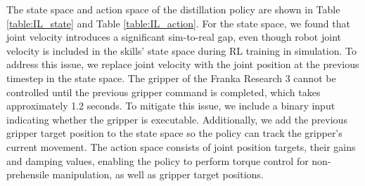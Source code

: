 

The state space and action space of the distillation policy are shown in Table \ref{table:IL_state} and Table \ref{table:IL_action}. For the state space, we found that joint velocity introduces a significant sim-to-real gap, even though robot joint velocity is included in the skills' state space during RL training in simulation. To address this issue, we replace joint velocity with the joint position at the previous timestep in the state space. The gripper of the Franka Research 3 cannot be controlled until the previous gripper command is completed, which takes approximately 1.2 seconds. To mitigate this issue, we include a binary input indicating whether the gripper is executable. Additionally, we add the previous gripper target position to the state space so the policy can track the gripper's current movement. The action space consists of joint position targets, their gains and damping values, enabling the policy to perform torque control for non-prehensile manipulation, as well as gripper target positions.

